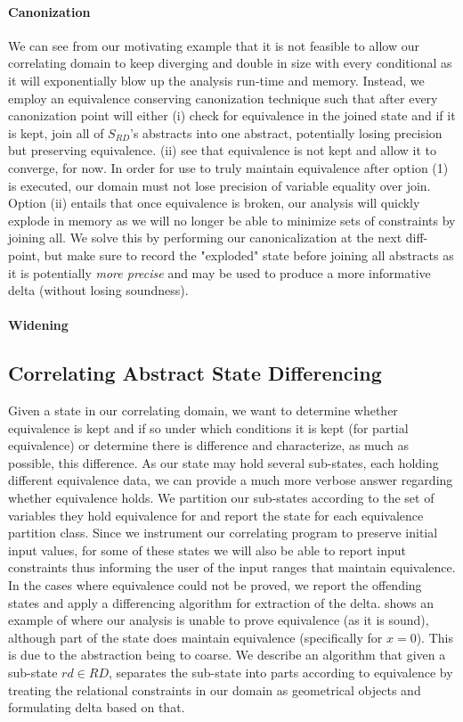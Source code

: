 \paragraph{Canonization}
We can see from our motivating example that it is not feasible to allow our correlating domain to keep diverging and double in size with every conditional as it will exponentially blow up the analysis run-time and memory. Instead, we employ an equivalence conserving canonization technique such that after every canonization point will either (i) check for equivalence in the joined state and if it is kept, join all of $S_{RD}$'s abstracts into one abstract, potentially losing precision but preserving equivalence. (ii) see that equivalence is not kept and allow it to converge, for now. In order for use to truly maintain equivalence after option (1) is executed, our domain must not lose precision of variable equality over join. Option (ii) entails that once equivalence is broken, our analysis will quickly explode in memory as we will no longer be able to minimize sets of constraints by joining all. We solve this by performing our canonicalization at the next diff-point, but make sure to record the "exploded" state before joining all abstracts as it is potentially \emph{more precise} and may be used to produce a more informative delta (without losing soundness).

\paragraph{Widening}



\subsection{Correlating Abstract State Differencing} 
Given a state in our correlating domain, we want to determine whether equivalence is kept and if so under which conditions it is kept (for partial equivalence) or determine there is difference and characterize, as much as possible, this difference. As our state may hold several sub-states, each holding different equivalence data, we can provide a much more verbose answer regarding whether equivalence holds. We partition our sub-states according to the set of variables they hold equivalence for and report the state for each equivalence partition class. Since we instrument our correlating program to preserve initial input values, for some of these states we will also be able to report input constraints thus informing the user of the input ranges that maintain equivalence. In the cases where equivalence could not be proved, we report the offending states and apply a differencing algorithm for extraction of the delta.  shows an example of where our analysis is unable to prove equivalence (as it is sound), although part of the state does maintain equivalence (specifically for $x=0$). This is due to the abstraction being to coarse. We describe an algorithm that given a sub-state $rd \in RD$, separates the sub-state into parts according to equivalence by treating the relational constraints in our domain as geometrical objects and formulating delta based on that.

